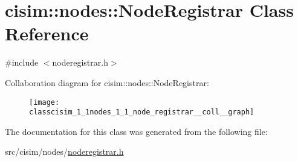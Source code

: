 \hypertarget{classcisim_1_1nodes_1_1_node_registrar}{}\section{cisim\+:\+:nodes\+:\+:Node\+Registrar Class Reference}
\label{classcisim_1_1nodes_1_1_node_registrar}


{\ttfamily \#include $<$noderegistrar.\+h$>$}



Collaboration diagram for cisim\+:\+:nodes\+:\+:Node\+Registrar\+:
\nopagebreak
\begin{figure}[H]
\begin{center}
\leavevmode
\texttt{[image: classcisim\_1\_1nodes\_1\_1\_node\_registrar\_\_coll\_\_graph]}
\end{center}
\end{figure}


The documentation for this class was generated from the following file\+:\begin{DoxyCompactItemize}
\item 
src/cisim/nodes/\hyperlink{noderegistrar_8h}{noderegistrar.\+h}\end{DoxyCompactItemize}
